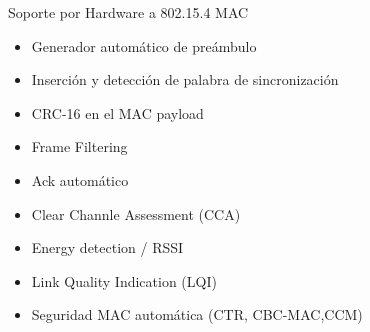 \documentclass[aspectratio=169]{beamer}
\begin{document}
\begin{frame}{Soporte por Hardware a 802.15.4 MAC} 
\begin{minipage}[c]{1.0\linewidth}
	\begin{minipage}[c]{0.6\linewidth}
		\begin{itemize}
			\item Generador automático de preámbulo	
			\item Inserción y detección de palabra de sincronización	
			\item CRC-16 en el MAC payload
			\item Frame Filtering
			\item Ack automático
			\item Clear Channle Assessment (CCA)
			\item Energy detection / RSSI
			\item Link Quality Indication (LQI)
			\item Seguridad MAC automática (CTR, CBC-MAC,CCM)
			\vspace{10px}
		\end{itemize}
	\end{minipage}
	\begin{minipage}[c]{0.35\linewidth}
		\begin{figure}[H]
			\label{cc2520}
		\end{figure}	  	  	
	\end{minipage}
\end{minipage}
\end{frame}
\end{document}
